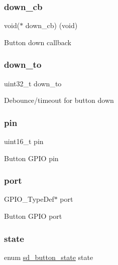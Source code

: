 \subsubsection{\texorpdfstring{down\+\_\+cb}{down\_cb}}
{\footnotesize\ttfamily void($\ast$ down\+\_\+cb) (void)}

Button down callback \mbox{\label{structsd__button_a3a9f2a46d68b7d2da0fafa3f2ddbdfb1}} 
\subsubsection{\texorpdfstring{down\+\_\+to}{down\_to}}
{\footnotesize\ttfamily uint32\+\_\+t down\+\_\+to}

Debounce/timeout for button down \mbox{\label{structsd__button_a4144813adfa4dfe7e7cbeea17d1b06eb}} 
\subsubsection{\texorpdfstring{pin}{pin}}
{\footnotesize\ttfamily uint16\+\_\+t pin}

Button G\+P\+IO pin \mbox{\label{structsd__button_a82241972e0292c7de95ea1e293e11be3}} 
\subsubsection{\texorpdfstring{port}{port}}
{\footnotesize\ttfamily G\+P\+I\+O\+\_\+\+Type\+Def$\ast$ port}

Button G\+P\+IO port \mbox{\label{structsd__button_ade8bc1d49a12e01bd732b12c411b9861}} 
\subsubsection{\texorpdfstring{state}{state}}
{\footnotesize\ttfamily enum \mbox{\hyperlink{group___s_d___button___types_gad961a8af755b135c7e69a304d4f6303c}{sd\+\_\+button\+\_\+state}} state}

